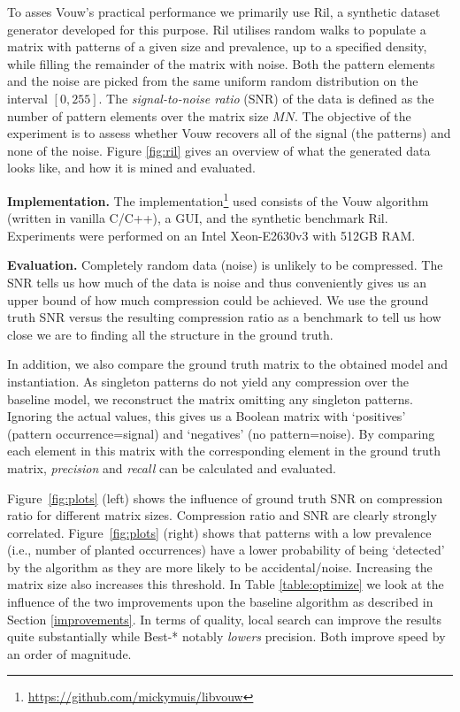 \documentclass{llncs}
\begin{document}
To asses Vouw's practical performance we primarily use Ril, a synthetic dataset generator developed for this purpose. Ril utilises random walks to populate a matrix with patterns of a given size and prevalence, up to a specified density, while filling the remainder of the matrix with noise. Both the pattern elements and the noise are picked from the same uniform random distribution on the interval $[0,255]$. The \emph{signal-to-noise ratio} (SNR) of the data is defined as the number of pattern elements over the matrix size $MN$. The objective of the experiment is to assess whether Vouw recovers all of the signal (the patterns) and none of the noise. Figure \ref{fig:ril} gives an overview of what the generated data looks like, and how it is mined and evaluated.

\smallskip \noindent \textbf{Implementation.} %
The implementation\footnote{\url{https://github.com/mickymuis/libvouw}} used consists of the Vouw algorithm (written in vanilla C/C++), a GUI, and the synthetic benchmark Ril. Experiments were performed on an Intel Xeon-E2630v3 with 512GB RAM.

\smallskip \noindent \textbf{Evaluation.} %
Completely random data (noise) is unlikely to be compressed. The SNR tells us how much of the data is noise and thus conveniently gives us an upper bound of how much compression could be achieved. We use the ground truth SNR versus the resulting compression ratio as a benchmark to tell us how close we are to finding all the structure in the ground truth. 

In addition, we also compare the ground truth matrix to the obtained model and instantiation. As singleton patterns do not yield any compression over the baseline model, we reconstruct the matrix omitting any singleton patterns. Ignoring the actual values, this gives us a Boolean matrix with `positives' (pattern occurrence=signal) and `negatives' (no pattern=noise). By comparing each element in this matrix with the corresponding element in the ground truth matrix, \emph{precision} and \emph{recall} can be calculated and evaluated.

Figure~\ref{fig:plots} (left) shows the influence of ground truth SNR on compression ratio for different matrix sizes. Compression ratio and SNR are clearly strongly correlated. Figure~\ref{fig:plots} (right) shows that patterns with a low prevalence (i.e., number of planted occurrences) have a lower probability of being `detected' by the algorithm as they are more likely to be accidental/noise. Increasing the matrix size also increases this threshold. In Table \ref{table:optimize} we look at the influence of the two improvements upon the baseline algorithm as described in Section \ref{improvements}. In terms of quality, local search can improve the results quite substantially while Best-* notably \emph{lowers} precision. Both improve speed by an order of magnitude.%
\end{document}
